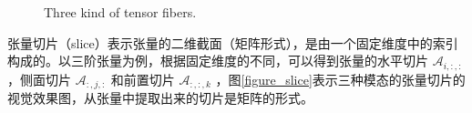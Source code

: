 \begin{figure}[htbp]
	\centering
	{Three kind of tensor fibers.}
	\label{figure_fiber}
\end{figure}

张量切片（slice）表示张量的二维截面（矩阵形式），是由一个固定维度中的索引构成的。以三阶张量为例，根据固定维度的不同，可以得到张量的水平切片 $ \mathcal{A}_{i,:,:} $ ，侧面切片 $ \mathcal{A}_{:,j,:} $ 和前置切片 $ \mathcal{A}_{:,:,k} $ ，图\ref{figure_slice}表示三种模态的张量切片的视觉效果图，从张量中提取出来的切片是矩阵的形式。

